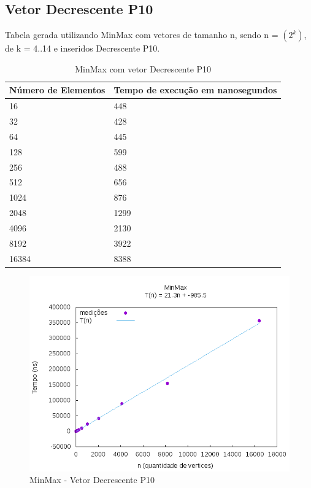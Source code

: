 \documentclass[12pt,a4paper,twoside]{report}
\begin{document}
\subsection{Vetor Decrescente P10}
Tabela gerada utilizando MinMax com vetores de tamanho n, sendo n = $(2^k)$, de k = 4..14 e inseridos Decrescente P10.
\begin{table}[H]
\centering
\caption{MinMax com vetor Decrescente P10}
\label{my-label}
\begin{tabular}{|l|l|}
\hline
\multicolumn{1}{|c|}{\textbf{Número de Elementos}} & \multicolumn{1}{c|}{\textbf{Tempo de execução em nanosegundos}} \\ \hline
16 & 448 \\ \hline
32 & 428 \\ \hline
64 & 445 \\ \hline
128 & 599 \\ \hline
256 & 488 \\ \hline
512 & 656 \\ \hline
1024 & 876 \\ \hline
2048 & 1299 \\ \hline
4096 & 2130 \\ \hline
8192 & 3922 \\ \hline
16384 & 8388 \\ \hline
\end{tabular}
\end{table}

\begin{figure}[H]
    \centering
    \includegraphics[width=0.7\linewidth]{graficos/Min Max/Decrescente P10/MinMax.png}
  \caption{MinMax - Vetor Decrescente P10}
\end{figure}
\end{document}
